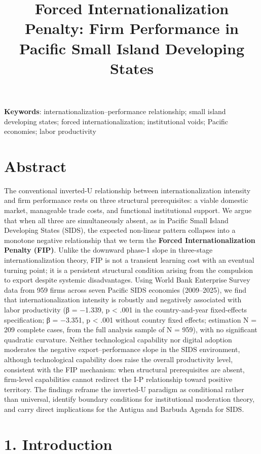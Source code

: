 \documentclass[
  12pt]{article}
\title{Forced Internationalization Penalty: Firm Performance in Pacific
Small Island Developing States}
\author{}
\date{}
\begin{document}
\maketitle

\textbf{Keywords}: internationalization--performance relationship; small
island developing states; forced internationalization; institutional
voids; Pacific economies; labor productivity

\hypertarget{abstract}{%
\section{Abstract}\label{abstract}}

The conventional inverted-U relationship between internationalization
intensity and firm performance rests on three structural prerequisites:
a viable domestic market, manageable trade costs, and functional
institutional support. We argue that when all three are simultaneously
absent, as in Pacific Small Island Developing States (SIDS), the
expected non-linear pattern collapses into a monotone negative
relationship that we term the \textbf{Forced Internationalization
Penalty (FIP)}. Unlike the downward phase-1 slope in three-stage
internationalization theory, FIP is not a transient learning cost with
an eventual turning point; it is a persistent structural condition
arising from the compulsion to export despite systemic disadvantages.
Using World Bank Enterprise Survey data from 959 firms across seven
Pacific SIDS economies (2009--2025), we find that internationalization
intensity is robustly and negatively associated with labor productivity
(β = −1.339, p \textless{} .001 in the country-and-year fixed-effects
specification; β = −3.351, p \textless{} .001 without country fixed
effects; estimation N = 209 complete cases, from the full analysis
sample of N = 959), with no significant quadratic curvature. Neither
technological capability nor digital adoption moderates the negative
export--performance slope in the SIDS environment, although
technological capability does raise the overall productivity level,
consistent with the FIP mechanism: when structural prerequisites are
absent, firm-level capabilities cannot redirect the I-P relationship
toward positive territory. The findings reframe the inverted-U paradigm
as conditional rather than universal, identify boundary conditions for
institutional moderation theory, and carry direct implications for the
Antigua and Barbuda Agenda for SIDS.

\hypertarget{introduction}{%
\section{1. Introduction}\label{introduction}}
\end{document}
